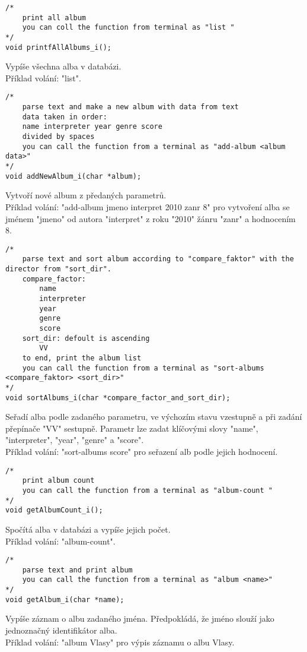 \begin{lstlisting}[style=CStyle]
/*
    print all album
    you can coll the function from terminal as "list "
*/
void printfAllAlbums_i();
\end{lstlisting}
Vypíše všechna alba v databázi.\\ 
Příklad volání: "list".

\begin{lstlisting}[style=CStyle]
/*
    parse text and make a new album with data from text
    data taken in order:
    name interpreter year genre score
    divided by spaces
    you can call the function from a terminal as "add-album <album data>"
*/
void addNewAlbum_i(char *album); 
\end{lstlisting}
Vytvoří nové album z předaných parametrů.\\ 
Příklad volání: "add-album jmeno interpret 2010 zanr 8" pro vytvoření alba se jménem "jmeno" od autora "interpret" z roku "2010" žánru "zanr" a hodnocením 8.
\newpage
\begin{lstlisting}[style=CStyle]
/*
    parse text and sort album according to "compare_faktor" with the director from "sort_dir".
    compare_factor:
        name
        interpreter
        year
        genre
        score
    sort_dir: defoult is ascending
        VV
    to end, print the album list
    you can call the function from a terminal as "sort-albums <compare_faktor> <sort_dir>"
*/
void sortAlbums_i(char *compare_factor_and_sort_dir);
\end{lstlisting}
Seřadí alba podle zadaného parametru, ve výchozím stavu vzestupně a při zadání přepínače "VV" sestupně.
Parametr lze zadat klíčovými slovy "name", "interpreter", "year", "genre" a "score".\\ 
Příklad volání: "sort-albums score" pro seřazení alb podle jejich hodnocení.

\begin{lstlisting}[style=CStyle]
/*
    print album count
    you can call the function from a terminal as "album-count "
*/
void getAlbumCount_i();
\end{lstlisting}
Spočítá alba v databázi a vypíše jejich počet.\\ 
Příklad volání: "album-count".

\begin{lstlisting}[style=CStyle]
/*
    parse text and print album
    you can call the function from a terminal as "album <name>"
*/
void getAlbum_i(char *name);
\end{lstlisting}
Vypíše záznam o albu zadaného jména.
Předpokládá, že jméno slouží jako jednoznačný identifikátor alba.\\ 
Příklad volání: "album Vlasy" pro výpis záznamu o albu Vlasy.

